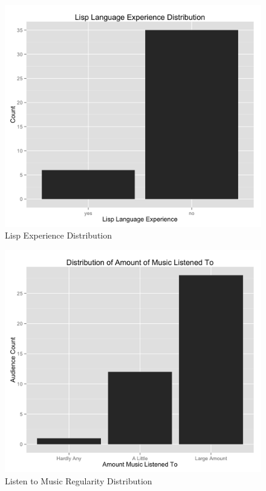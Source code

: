 \begin{figure}
    \centering
    \includegraphics[width=1.0\linewidth]{../study-2/results/graphs/lisp.png}
    \caption{Lisp Experience Distribution}
    \label{lispdistribution}
\end{figure}


\begin{figure}
    \centering
    \includegraphics[width=1.0\linewidth]{../study-2/results/graphs/music.png}
    \caption{Listen to Music Regularity Distribution}
    \label{musicdistribution}
\end{figure}%

